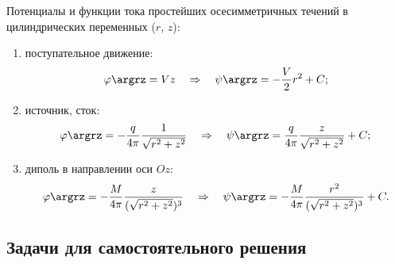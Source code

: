 \documentclass[14pt]{extarticle}
\begin{document}
Потенциалы и функции тока простейших осесимметричных течений в цилиндрических переменных ($r$, $z$):

\begin{enumerate}
	\item поступательное движение:
		\begin{equation}
			\label{eq:translation_3D}
			\varphi\argrz = V z \quad\Rightarrow\quad
			\psi\argrz = -\frac{V}{2}r^2 + C;
		\end{equation}
	\item  источник, сток:
		\begin{equation}
			\label{eq:source_3D}
			\varphi\argrz = -\frac{q}{4\pi} \frac{1}{\sqrt{r^2+z^2}}\quad\Rightarrow\quad
			\psi\argrz = \frac{q}{4\pi}\frac{z}{\sqrt{r^2+z^2}} + C;
		\end{equation}	
		\item диполь в направлении оси $Oz$:
			\begin{equation}
				\label{eq:dipol_3D}
				\varphi\argrz =  -\frac{M}{4\pi} \frac{z}{(\sqrt{r^2+z^2})^3}\quad\Rightarrow\quad
				\psi\argrz =  -\frac{M}{4\pi} \frac{r^2}{(\sqrt{r^2+z^2})^3}+C.
			\end{equation}
		
\end{enumerate}

\subsection{Задачи для самостоятельного решения}
\end{document}
